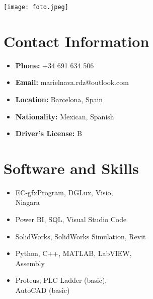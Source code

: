 \documentclass[11pt,a4paper]{article}
\begin{document}
\begin{minipage}[t]{0.3\textwidth}
\RaggedRight

\texttt{[image: foto.jpeg]} \\
\vspace{1em} %

\colorbox{verylightgray}{\parbox{\dimexpr\textwidth-2\fboxsep\relax}{\RaggedRight
\vspace{01em} %

\section*{Contact Information}
\footnotesize
\begin{itemize}
    \item \textbf{Phone:} +34 691 634 506
    \item \textbf{Email:} marielnava.rdz@outlook.com
    \item \textbf{Location:} Barcelona, Spain
    \item \textbf{Nationality:} Mexican, Spanish
    \item \textbf{Driver's License:} B
\end{itemize}
\vspace{1em} %

\section*{Software and Skills}
\footnotesize
\begin{itemize}
    \item EC-gfxProgram, DGLux, Visio,\\
    Niagara
    \item Power BI, SQL, Visual Studio Code
    \item SolidWorks, SolidWorks Simulation, Revit
    \item Python, C++, MATLAB, LabVIEW,\\
    Assembly
    \item Proteus, PLC Ladder (basic),\\
    AutoCAD (basic)
\end{itemize}
\vspace{1em} %

}}
\end{minipage}
\end{document}
